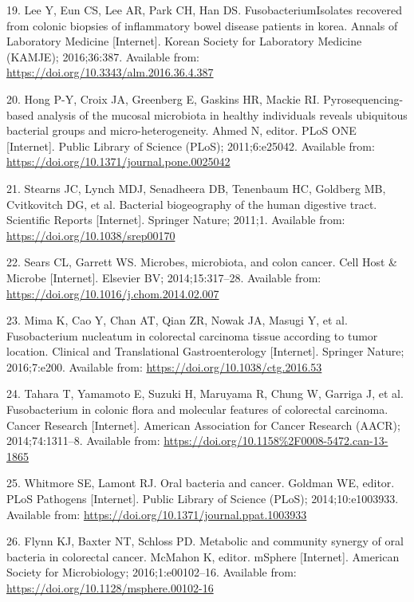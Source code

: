 \documentclass[12pt,]{article}
\begin{document}
\hypertarget{ref-Lee2016}{}
19. Lee Y, Eun CS, Lee AR, Park CH, Han DS. FusobacteriumIsolates
recovered from colonic biopsies of inflammatory bowel disease patients
in korea. Annals of Laboratory Medicine {[}Internet{]}. Korean Society
for Laboratory Medicine (KAMJE); 2016;36:387. Available from:
\url{https://doi.org/10.3343/alm.2016.36.4.387}

\hypertarget{ref-Hong2011}{}
20. Hong P-Y, Croix JA, Greenberg E, Gaskins HR, Mackie RI.
Pyrosequencing-based analysis of the mucosal microbiota in healthy
individuals reveals ubiquitous bacterial groups and micro-heterogeneity.
Ahmed N, editor. PLoS ONE {[}Internet{]}. Public Library of Science
(PLoS); 2011;6:e25042. Available from:
\url{https://doi.org/10.1371/journal.pone.0025042}

\hypertarget{ref-Stearns2011}{}
21. Stearns JC, Lynch MDJ, Senadheera DB, Tenenbaum HC, Goldberg MB,
Cvitkovitch DG, et al. Bacterial biogeography of the human digestive
tract. Scientific Reports {[}Internet{]}. Springer Nature; 2011;1.
Available from: \url{https://doi.org/10.1038/srep00170}

\hypertarget{ref-Sears2014}{}
22. Sears CL, Garrett WS. Microbes, microbiota, and colon cancer. Cell
Host \& Microbe {[}Internet{]}. Elsevier BV; 2014;15:317--28. Available
from: \url{https://doi.org/10.1016/j.chom.2014.02.007}

\hypertarget{ref-Mima2016}{}
23. Mima K, Cao Y, Chan AT, Qian ZR, Nowak JA, Masugi Y, et al.
Fusobacterium nucleatum in colorectal carcinoma tissue according to
tumor location. Clinical and Translational Gastroenterology
{[}Internet{]}. Springer Nature; 2016;7:e200. Available from:
\url{https://doi.org/10.1038/ctg.2016.53}

\hypertarget{ref-Tahara_2014}{}
24. Tahara T, Yamamoto E, Suzuki H, Maruyama R, Chung W, Garriga J, et
al. Fusobacterium in colonic flora and molecular features of colorectal
carcinoma. Cancer Research {[}Internet{]}. American Association for
Cancer Research (AACR); 2014;74:1311--8. Available from:
\url{https://doi.org/10.1158\%2F0008-5472.can-13-1865}

\hypertarget{ref-Whitmore2014}{}
25. Whitmore SE, Lamont RJ. Oral bacteria and cancer. Goldman WE,
editor. PLoS Pathogens {[}Internet{]}. Public Library of Science (PLoS);
2014;10:e1003933. Available from:
\url{https://doi.org/10.1371/journal.ppat.1003933}

\hypertarget{ref-Flynn2016}{}
26. Flynn KJ, Baxter NT, Schloss PD. Metabolic and community synergy of
oral bacteria in colorectal cancer. McMahon K, editor. mSphere
{[}Internet{]}. American Society for Microbiology; 2016;1:e00102--16.
Available from: \url{https://doi.org/10.1128/msphere.00102-16}
\end{document}
